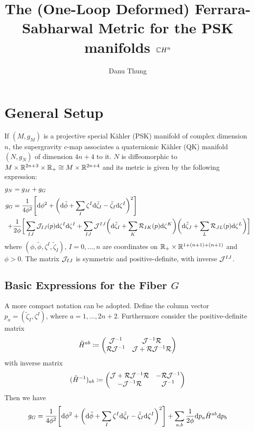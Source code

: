 \documentclass[parskip=half]{scrartcl}
\title{The (One-Loop Deformed) Ferrara-Sabharwal Metric for the PSK manifolds \texorpdfstring{$\mathbb{C} H^n$}{CH^n}}
\author{Danu Thung}
\date{}
\begin{document}
\maketitle
\tableofcontents

\section{General Setup}

If $(M,g_M)$ is a projective special K\"ahler (PSK) manifold of complex dimension $n$, the supergravity $c$-map associates a quaternionic K\"ahler (QK) manifold $(N,g_N)$ of dimension $4n+4$ to it. $N$ is diffeomorphic to $M\times \mathbb{R}^{2n+3}\times \mathbb{R}_+\cong M\times \mathbb{R}^{2n+4}$ and its metric is given by the following expression:
\begin{align*}
	g_N&=g_M+g_G\\
	g_G&=\frac{1}{4\phi^2}\Bigg[\mathrm{d} \phi^2
	+\bigg(\mathrm{d} \tilde{\phi}+\sum_I \zeta^I \mathrm{d} \tilde{\zeta}_I-\tilde{\zeta}_I \mathrm{d} \zeta^I\bigg)^2\Bigg]\\
	+&\frac{1}{2\phi}\bigg[\sum_{IJ} \mathcal{J}_{IJ}(p)\mathrm{d} \zeta^I\mathrm{d}\zeta^I+
	\sum_{IJ}\mathcal{J}^{IJ}\bigg(\mathrm{d} \tilde \zeta_I+\sum_K \mathcal{R}_{IK}(p)\mathrm{d} \zeta^K\bigg)
	\bigg(\mathrm{d}\tilde \zeta_J + \sum_L \mathcal{R}_{JL}(p)\mathrm{d} \zeta^L\bigg)\bigg]
\end{align*}
where $(\phi,\tilde\phi,\zeta^I,\tilde\zeta_I)$, $I=0,\dots, n$ are coordinates on $\mathbb{R}_+\times \mathbb{R}^{1+(n+1)+(n+1)}$ and $\phi>0$. The matrix $\mathcal{J}_{IJ}$ is symmetric and positive-definite, with inverse $\mathcal{J}^{IJ}$. 

\subsection{Basic Expressions for the Fiber \texorpdfstring{$G$}{G}}

A more compact notation can be adopted. Define the column vector $p_a=(\tilde \zeta_I,\zeta^I)$, where $a=1,\dots,2n+2$. Furthermore consider the positive-definite matrix
\begin{equation*}
	\tilde H^{ab}\coloneqq 
	\begin{pmatrix}
		\mathcal{J}^{-1} & \mathcal{J}^{-1}\mathcal{R}\\
		\mathcal{R}\mathcal{J}^{-1} & \mathcal{J}+\mathcal{R}\mathcal{J}^{-1}\mathcal{R}
	\end{pmatrix}
\end{equation*}
with inverse matrix
\begin{equation*}
	(\tilde H^{-1})_{ab}\coloneqq 
	\begin{pmatrix}
		\mathcal{J}+\mathcal{R}\mathcal{J}^{-1}\mathcal{R} & -\mathcal{R}\mathcal{J}^{-1}\\
		-\mathcal{J}^{-1}\mathcal{R} & \mathcal{J}^{-1}
	\end{pmatrix}
\end{equation*}
Then we have 
\begin{equation*}
	g_G=\frac{1}{4\phi^2}\Bigg[\mathrm{d} \phi^2
	+\bigg(\mathrm{d} \tilde{\phi}+\sum_I \zeta^I \mathrm{d} \tilde{\zeta}_I-\tilde{\zeta}_I \mathrm{d} \zeta^I\bigg)^2\Bigg]
	+\sum_{a,b}\frac{1}{2\phi}\mathrm{d} p_a \tilde H^{ab} \mathrm{d} p_b
\end{equation*}
\end{document}
